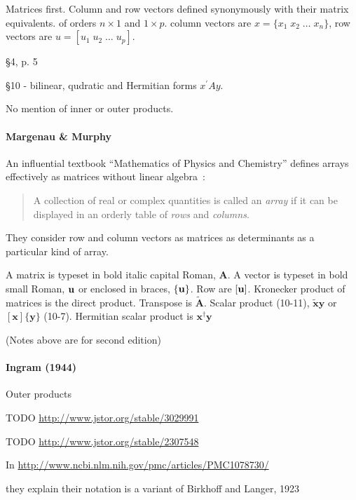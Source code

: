 Matrices first. Column and row vectors defined synonymously with their matrix equivalents.
of orders $n\times1$ and $1\times p$.
column vectors are $x = \{x_1\;x_2\;\dots\;x_n\}$,
row vectors are $u = [u_1\;u_2\;\dots\;u_p]$.

\S 4, p. 5

\S 10 - bilinear, qudratic and Hermitian forms $x^\prime A y$.

No mention of inner or outer products.


\paragraph{Margenau \& Murphy~\cite{Margenau1943}}

An influential textbook ``Mathematics of Physics and Chemistry'' defines arrays
effectively as matrices without linear algebra~\cite[\S 10.1, p. 288]{Margenau1943}:

\begin{quote}
A collection of real or complex quantities is called an
\textit{array} if it can be displayed in an orderly table of \textit{rows} and \textit{columns}.
\end{quote}

They consider row and column vectors as matrices as determinants as a particular kind of array.

A matrix is typeset in bold italic capital Roman, $\boldsymbol A$.
A vector is typeset in bold small Roman, $\textbf u$ or enclosed in braces, $\{ \textbf u \}$.
Row are $[\textbf u ]$.
Kronecker product of matrices is the direct product.
Transpose is $\tilde{\boldsymbol A}$.
Scalar product (10-11), $\tilde{\mathbf x} \mathbf y$ or $[\mathbf x] \{\mathbf y\}$ (10-7).
Hermitian scalar product is $\mathbf x^\dagger \mathbf y$



(Notes above are for second edition)



\paragraph{Ingram (1944)}

Outer products

TODO \url{http://www.jstor.org/stable/3029991}

TODO \url{http://www.jstor.org/stable/2307548}

In
\url{http://www.ncbi.nlm.nih.gov/pmc/articles/PMC1078730/}

they explain their notation is a variant of Birkhoff and Langer, 1923

